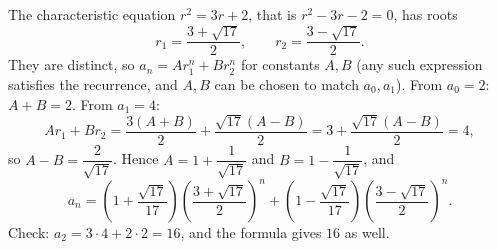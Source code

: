 The characteristic equation $r^2=3r+2$, that is $r^2-3r-2=0$, has roots
\[
r_1=\dfrac{3+\sqrt{17}}{2},\qquad r_2=\dfrac{3-\sqrt{17}}{2}.
\]
They are distinct, so $a_n=Ar_1^n+Br_2^n$ for constants $A,B$ (any such expression satisfies the recurrence, and $A,B$ can be chosen to match $a_0,a_1$). From $a_0=2$: $A+B=2$. From $a_1=4$:
\[
Ar_1+Br_2=\dfrac{3(A+B)}{2}+\dfrac{\sqrt{17}(A-B)}{2}=3+\dfrac{\sqrt{17}(A-B)}{2}=4,
\]
so $A-B=\dfrac{2}{\sqrt{17}}$. Hence $A=1+\dfrac{1}{\sqrt{17}}$ and $B=1-\dfrac{1}{\sqrt{17}}$, and
\[
\boxed{a_n=\left(1+\dfrac{\sqrt{17}}{17}\right)\left(\dfrac{3+\sqrt{17}}{2}\right)^n+\left(1-\dfrac{\sqrt{17}}{17}\right)\left(\dfrac{3-\sqrt{17}}{2}\right)^n}.
\]
Check: $a_2=3\cdot4+2\cdot2=16$, and the formula gives $16$ as well.
